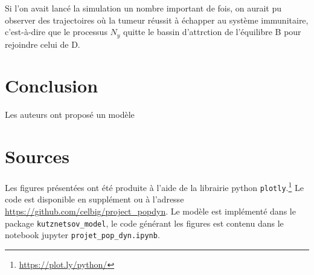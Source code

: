\documentclass[12pt]{article}
\begin{document}
Si l'on avait lanc\'e la simulation un nombre important de fois, on aurait pu observer des trajectoires o\`u la tumeur r\'eussit \`a \'echapper au syst\`eme immunitaire, c'est-\`a-dire que le processus $N_y$ quitte le bassin d'attrction de l'\'equilibre B pour rejoindre celui de D. 


\section*{Conclusion}
Les auteurs ont proposé un mod\`ele 
\section*{Sources}
Les figures présentées ont été produite  à l'aide de la librairie python \texttt{plotly}.\footnote{\url{https://plot.ly/python/}} Le code est disponible en supplément ou à l'adresse \url{https://github.com/celbig/project_popdyn}. Le modèle est implémenté dans le package \texttt{kutznetsov\_model}, le code générant les figures est contenu dans le notebook jupyter \texttt{projet\_pop\_dyn.ipynb}.

\clearpage


\end{document}
